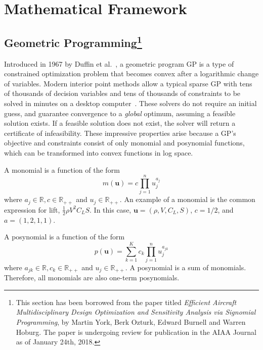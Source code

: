\chapter{Mathematical Framework}

\section[Geometric Programming]{Geometric Programming\footnote{This section has been borrowed from the paper
titled \textit{Efficient Aircraft Multidisciplinary Design Optimization and Sensitivity Analysis via Signomial Programming},
by Martin York, Berk Ozturk, Edward Burnell and Warren Hoburg.
The paper is undergoing review for publication in the AIAA Journal as of January 24th, 2018.}}
\label{a:gpintro}

Introduced in 1967 by Duffin et al.~\cite{duffingp}, a geometric program \gls{GP} is
a type of constrained optimization problem that becomes convex after a
logarithmic change of variables. Modern interior point methods allow a typical
sparse \gls{GP} with tens of thousands of decision variables and tens of thousands of
constraints to be solved in minutes on a desktop computer~\cite{convex}. These
solvers do not require an initial guess, and guarantee convergence to a
\textit{global} optimum, assuming a feasible solution exists. If a feasible
solution does not exist, the solver will return a certificate of infeasibility.
These impressive properties arise because a GP's objective and
constraints consist of only monomial and posynomial functions, which can be
transformed into convex functions in log space.

A monomial is a function of the form
\begin{equation}\label{e:monomial}
m(\mathbf{u}) = c\prod_{j=1}^{n} u_{j}^{a_{j}}
\end{equation}
where $a_{j} \in \mathbb{R}, c \in \mathbb{R}_{++}$ and $u_{j} \in
\mathbb{R_{++}}$. An example of a monomial is the common expression for lift,
$\frac{1}{2} \rho V^2C_{L}S$. In this case, $\mathbf{u} = (\rho, V, C_{L}, S)$,
$c= 1/2$, and $a = (1, 2, 1, 1)$.

A posynomial is a function of the form
\begin{equation}\label{e:posynomial}
p(\mathbf{u}) = \sum_{k=1}^{K}c_{k}\prod_{j=1}^{n} u_{j}^{a_{jk}}
\end{equation}
where $a_{jk} \in \mathbb{R}, c_{k} \in \mathbb{R}_{++}$ and $u_{j} \in
\mathbb{R_{++}}$. A posynomial is a sum of monomials. Therefore, all monomials
are also one-term posynomials.

